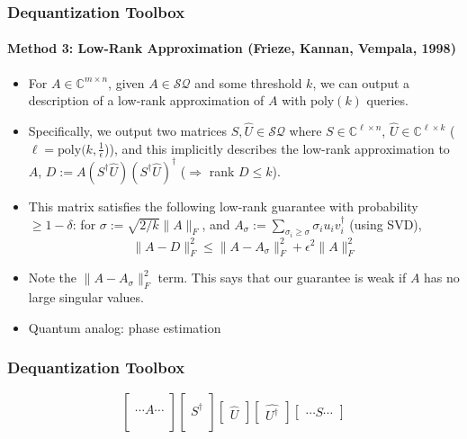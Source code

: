 \documentclass{beamer}
\newcommand\0{\mathbf{0}}
\newcommand\CC{\mathbb{C}}
\newcommand\<{\langle}
\renewcommand\>{\rangle}
\renewcommand\implies{\Rightarrow}
\begin{document}
\begin{frame}
\frametitle{Dequantization Toolbox}
\framesubtitle{Method 3: Low-Rank Approximation (Frieze, Kannan, Vempala, 1998)}
\begin{itemize}
\item For $A \in \CC^{m\times n}$, given $A \in \mathcal{SQ}$ and some threshold $k$, we can output a description of a low-rank approximation of $A$ with $\text{poly}(k)$ queries.
\item Specifically, we output two matrices $S,\hat{U}\in \mathcal{SQ}$ where $S \in \CC^{\ell \times n}$, $\hat{U} \in \CC^{\ell \times k}$ ($\ell = \text{poly}(k,\frac{1}{\epsilon}$)), and this implicitly describes the low-rank approximation to $A$, $D := A(S^\dagger\hat{U})(S^\dagger\hat{U})^\dag$ ($\implies$ rank $D \leq k$).

\item This matrix satisfies the following low-rank guarantee with probability $\geq 1-\delta$: for $\sigma := \sqrt{2/k}\|A\|_F$, and $A_{\sigma} := \sum_{\sigma_i \geq \sigma} \sigma_iu_iv_i^\dag$ (using SVD), 
$$\|A - D\|_F^2 \leq \|A - A_\sigma\|_F^2 + \epsilon^2\|A\|_F^2$$
\item Note the $\|A - A_\sigma\|_F^2$ term. This says that our guarantee is weak if $A$ has no large singular values. 
\item Quantum analog: phase estimation
\end{itemize}
\end{frame}

\begin{frame}
\frametitle{Dequantization Toolbox}

$$
\begin{bmatrix}
\\
\cdots A \cdots 
\\
\\	
\end{bmatrix}
\begin{bmatrix}
\\
S^\dag
\\
\\	
\end{bmatrix}
\begin{bmatrix}
\hat{U}
\end{bmatrix}
\begin{bmatrix}
\hat{U^\dag}
\end{bmatrix}
\begin{bmatrix}
\cdots S \cdots
\end{bmatrix}
$$
​		
\end{frame}
\end{document}
